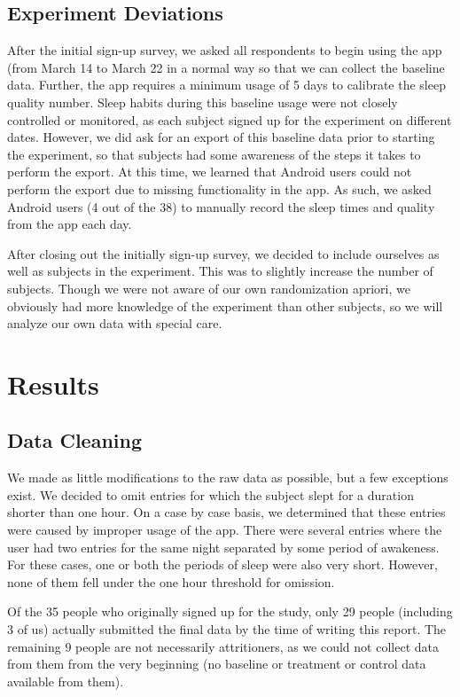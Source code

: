 \documentclass[12pt,]{article}
\begin{document}
\subsection{Experiment Deviations}\label{experiment-deviations}

After the initial sign-up survey, we asked all respondents to begin
using the app (from March 14 to March 22 in a normal way so that we can
collect the baseline data. Further, the app requires a minimum usage of
5 days to calibrate the sleep quality number. Sleep habits during this
baseline usage were not closely controlled or monitored, as each subject
signed up for the experiment on different dates. However, we did ask for
an export of this baseline data prior to starting the experiment, so
that subjects had some awareness of the steps it takes to perform the
export. At this time, we learned that Android users could not perform
the export due to missing functionality in the app. As such, we asked
Android users (4 out of the 38) to manually record the sleep times and
quality from the app each day.

After closing out the initially sign-up survey, we decided to include
ourselves as well as subjects in the experiment. This was to slightly
increase the number of subjects. Though we were not aware of our own
randomization apriori, we obviously had more knowledge of the experiment
than other subjects, so we will analyze our own data with special care.

\section{Results}\label{results}

\subsection{Data Cleaning}\label{data-cleaning}

We made as little modifications to the raw data as possible, but a few
exceptions exist. We decided to omit entries for which the subject slept
for a duration shorter than one hour. On a case by case basis, we
determined that these entries were caused by improper usage of the app.
There were several entries where the user had two entries for the same
night separated by some period of awakeness. For these cases, one or
both the periods of sleep were also very short. However, none of them
fell under the one hour threshold for omission.

Of the 35 people who originally signed up for the study, only 29 people
(including 3 of us) actually submitted the final data by the time of
writing this report. The remaining 9 people are not necessarily
attritioners, as we could not collect data from them from the very
beginning (no baseline or treatment or control data available from
them).
\end{document}
